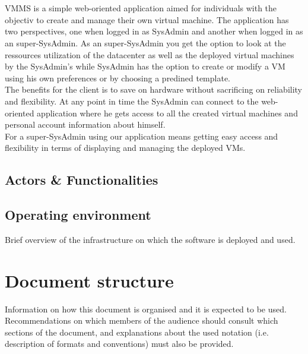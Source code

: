 \section{\mysystemname}

VMMS is a simple web-oriented application aimed for individuals with the
objectiv to create and manage their own virtual machine. The application    
has two perspectives, one when logged in as SysAdmin and another when
logged in as an super-SysAdmin. As an super-SysAdmin you get the option to look
at the ressources utilization of the datacenter as well as the deployed virtual
machines by the SysAdmin's while SysAdmin has the option to create or modify 
a VM using his own preferences or by choosing a predined template.\\The benefits
for the client is to save on hardware without sacrificing on reliability and 
flexibility. At any point in time the SysAdmin can connect to the web-oriented
application where he gets access to all the created virtual machines and
personal account information about himself.\\For a super-SysAdmin using our
application means getting easy access and flexibility in terms of displaying and managing the deployed VMs.

\subsection{Actors \& Functionalities}




\subsection{Operating environment}
Brief overview of the infrastructure on which the software is deployed and used.

\section{Document structure}  
Information on how this document is organised and it is expected to be
used. Recommendations on which members of the audience
should consult which sections of the document, and explanations about the used
notation (i.e. description of formats and conventions) must also be provided.





